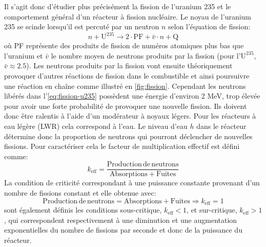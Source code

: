 Il s'agit donc d'étudier plus précisément la fission de l'uranium 235 et le comportement général d'un réacteur à fission nucléaire. Le noyau de l'uranium 235 se scinde lorsqu'il est percuté par un neutron $n$ selon l'équation de fission:
\begin{equation}
    n + \mathrm{U}^{235} \to 2\cdot \mathrm{PF} + \bar{v} \cdot n + \mathrm{Q}
    \label{eq:fission-u235}
\end{equation}
où PF représente des produits de fission de numéros atomiques plus bas que l'uranium et $\bar{v}$ le nombre moyen de neutrons produits par la fission (pour l'$\mathrm{U}^{235}$, $\bar{v} \approx 2.5$). Les neutrons produits par la fission vont ensuite théoriquement provoquer d'autres réactions de fission dans le combustible et ainsi poursuivre une réaction en chaîne comme illustré en \autoref{fig:fission}. Cependant les neutrons libérés dans l'\autoref{eq:fission-u235} possèdent une énergie d'environ 2 \si{\mega\electronvolt}, trop élevée pour avoir une forte probabilité de provoquer une nouvelle fission. Ils doivent donc être ralentis à l'aide d'un modérateur à noyaux légers. Pour les réacteurs à eau légère (LWR) cela correspond à l'eau. Le niveau d'eau $h$ dans le réacteur détermine donc la proportion de neutrons qui pourront déclencher de nouvelles fissions. Pour caractériser cela le facteur de multiplication effectif est défini comme:
\begin{equation}
    k_\mathrm{eff} = \frac{\mathrm{Production \, de \, neutrons}}{\mathrm{Absorptions} + \mathrm{Fuites}}
\end{equation}
La condition de criticité correspondant à une puissance constante provenant d'un nombre de fissions constant et elle obtenue avec:
\begin{equation}
    \mathrm{Production \, de \, neutrons} = \mathrm{Absorptions} + \mathrm{Fuites} \Rightarrow k_\mathrm{eff} = 1
\end{equation}
sont également définis les conditions sous-critique, $k_\mathrm{eff} < 1$, et sur-critique, $k_\mathrm{eff}>1$, qui correspondent respectivement à une diminution et une augmentation exponentielles du nombre de fissions par seconde et donc de la puissance du réacteur.

